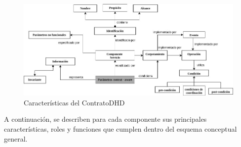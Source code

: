 \begin{figure}
\begin{center}
 \includegraphics [width=5.8 in,totalheight=3 in]{Ch4/contrato_conceptual}
\end{center}
\caption{Características del ContratoDHD}
\label{fig:contratov2}
\end{figure}

A continuación, se describen para cada componente sus principales características, roles y funciones que cumplen dentro del esquema conceptual general.

